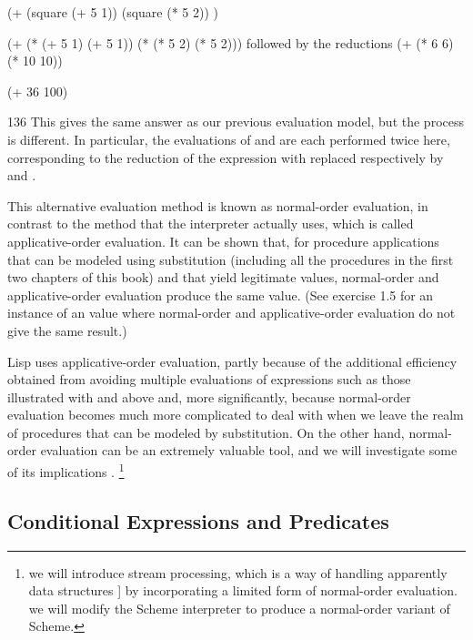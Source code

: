 (+    (square (+ 5 1))      (square (* 5 2))  )

(+    (* (+ 5 1) (+ 5 1))   (* (* 5 2) (* 5 2)))
\stopcode
followed by the reductions
\startcode
(+         (* 6 6)             (* 10 10))

(+           36                   100)

                    136
\stopcode
This gives the same answer as our previous evaluation model, but the process is different.
In particular, the evaluations of  and  are each performed twice here,
corresponding to the reduction of the expression 
with  replaced respectively by  and .

This alternative  evaluation method is known as normal-order evaluation,
in contrast to the  method that the interpreter actually uses,
which is called applicative-order evaluation.
It can be shown that,
for procedure applications that can be modeled using substitution
(including all the procedures in the first two chapters of this book)
and that yield legitimate values,
normal-order and applicative-order evaluation produce the same value.
(See exercise 1.5 for an instance of an  value where normal-order
and applicative-order evaluation do not give the same result.)

Lisp uses applicative-order evaluation,
partly because of the additional efficiency obtained from avoiding multiple evaluations of expressions
such as those illustrated with  and  above and, more significantly,
because normal-order evaluation becomes much more complicated to deal with
when we leave the realm of procedures that can be modeled by substitution.
On the other hand,
normal-order evaluation can be an extremely valuable tool,
and we will investigate some of its implications .
\footnote{%
    we will introduce stream processing,
   which is a way of handling apparently  data structures ]
   by incorporating a limited form of normal-order evaluation.
    we will modify the Scheme interpreter to produce a normal-order variant of Scheme.
}

\subsection{Conditional Expressions and Predicates}

